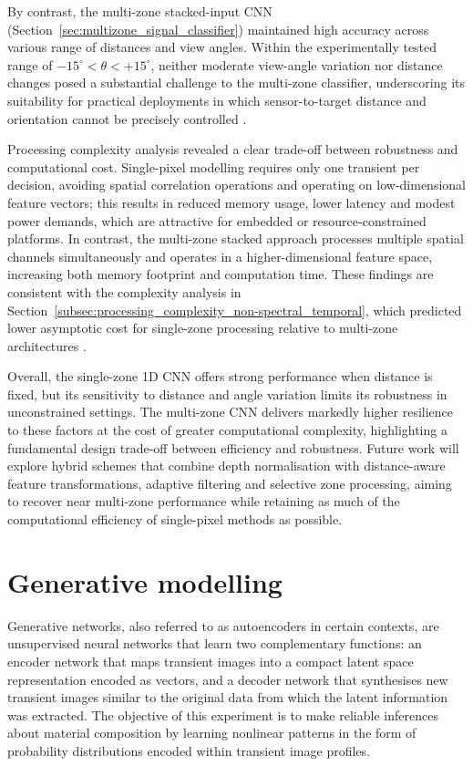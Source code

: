 \documentclass[12pt,a4paper,oneside]{report}
\let\oldsection\section
\renewcommand{\section}{\clearpage\oldsection}
\begin{document}
By contrast, the multi-zone stacked-input CNN (Section~\ref{sec:multizone_signal_classifier}) maintained high accuracy across various range of distances and view angles. Within the experimentally tested range of $-15^{\circ} < \theta < +15^{\circ}$, neither moderate view-angle variation nor distance changes posed a substantial challenge to the multi-zone classifier, underscoring its suitability for practical deployments in which sensor-to-target distance and orientation cannot be precisely controlled \cite{fasolino2024}.

Processing complexity analysis revealed a clear trade-off between robustness and computational cost. Single-pixel modelling requires only one transient per decision, avoiding spatial correlation operations and operating on low-dimensional feature vectors; this results in reduced memory usage, lower latency and modest power demands, which are attractive for embedded or resource-constrained platforms. In contrast, the multi-zone stacked approach processes multiple spatial channels simultaneously and operates in a higher-dimensional feature space, increasing both memory footprint and computation time. These findings are consistent with the complexity analysis in Section~\ref{subsec:processing_complexity_non-spectral_temporal}, which predicted lower asymptotic cost for single-zone processing relative to multi-zone architectures \cite{knuth1976,bishop2006}.

Overall, the single-zone 1D CNN offers strong performance when distance is fixed, but its sensitivity to distance and angle variation limits its robustness in unconstrained settings. The multi-zone CNN delivers markedly higher resilience to these factors at the cost of greater computational complexity, highlighting a fundamental design trade-off between efficiency and robustness. Future work will explore hybrid schemes that combine depth normalisation with distance-aware feature transformations, adaptive filtering and selective zone processing, aiming to recover near multi-zone performance while retaining as much of the computational efficiency of single-pixel methods as possible.

\newpage
\section{Generative modelling}
\label{sec:generative_modelling}

Generative networks, also referred to as autoencoders in certain contexts, are unsupervised neural networks that learn two complementary functions: an encoder network that maps transient images into a compact latent space representation encoded as vectors, and a decoder network that synthesises new transient images similar to the original data from which the latent information was extracted. The objective of this experiment is to make reliable inferences about material composition by learning nonlinear patterns in the form of probability distributions encoded within transient image profiles.
\end{document}
